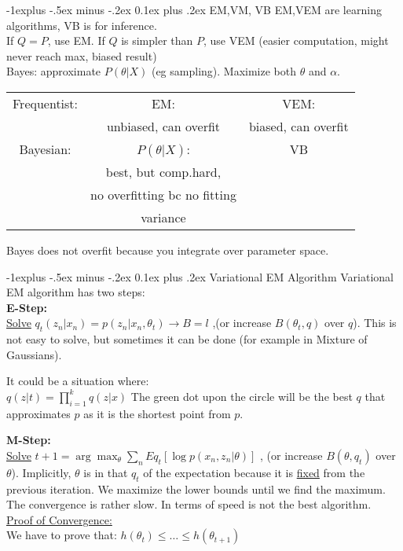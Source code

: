 \documentclass[9pt,landscape]{article}
\makeatletter
\renewcommand{\subsection}{\@startsection{subsection}{2}{0mm}%
                                {-1explus -.5ex minus -.2ex}%
                                {0.1ex plus .2ex}%
                                {\normalfont\scriptsize\bfseries}}
\makeatother
\begin{document}
\begin{multicols}{3}
\subsection{EM,VM, VB}
EM,VEM are learning algorithms, VB is for inference.\\
If $Q=P$, use EM. If $Q$ is simpler than $P$, use VEM (easier computation, might never reach max, biased result)\\
Bayes: approximate $P(\theta|X)$ (eg sampling). Maximize both $\theta$ and $\alpha$.\\
\begin{tabular}{|c|c|c|}
\hline
Frequentist: & EM:  & VEM: \\
 & unbiased, can overfit & biased, can overfit\\
\hline
Bayesian: & $P(\theta|X)$: & VB\\
& best, but comp.hard,  & \\
& no overfitting bc no fitting & \\
& variance & \\
\hline
\end{tabular}
Bayes does not overfit because you integrate over parameter space.

\subsection{Variational EM Algorithm}
Variational EM algorithm has two steps:\\
 \textbf{E-Step:}\\
  \underline{Solve}
  $
  q_{t}(z_{n}|x_{n}) = p(z_{n}|x_{n},\theta_{t})\rightarrow B = l
  $
,(or increase $B(\theta_t, q)$ over $q$). This is not easy to solve, but sometimes it can be done (for example in Mixture of Gaussians).

It could be a situation where:\\
$
q(z|t) = \prod_{i=1}^k q(z|x)
$
The green dot upon the circle will be the best $q$ that approximates $p$ as it is the shortest point from $p$.

\textbf{M-Step:}\\
\underline{Solve}
$
{t+1} = \arg\max_{\theta} \sum_{n} Eq_{t}[\log p(x_{n},z_{n}|\theta)]
$
, (or increase $B(\theta,q_{t})$ over $\theta$). Implicitly, $\theta$ is in that $q_{t}$ of the expectation because it is \underline{fixed} from the previous iteration. We maximize the lower bounds until we find the maximum. The convergence is rather slow. In terms of speed is not the best algorithm.\\
\underline{Proof of Convergence:}\\
We have to prove that:
$
h(\theta_{t}) \leq \ldots \leq h(\theta_{t+1})
$


\end{multicols}
\end{document}
